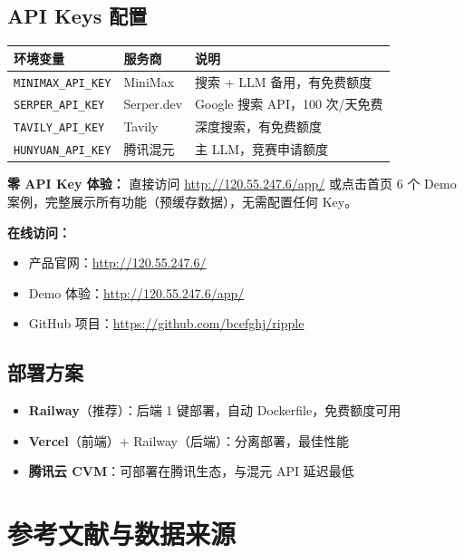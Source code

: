 \documentclass[12pt,a4paper]{ctexart}
\begin{document}
\subsection{API Keys 配置}

\begin{center}
\begin{tabular}{p{3.5cm} p{4cm} p{6cm}}
\toprule
\textbf{环境变量} & \textbf{服务商} & \textbf{说明} \\
\midrule
\texttt{MINIMAX\_API\_KEY} & MiniMax & 搜索 + LLM 备用，有免费额度 \\[2pt]
\texttt{SERPER\_API\_KEY} & Serper.dev & Google 搜索 API，100 次/天免费 \\[2pt]
\texttt{TAVILY\_API\_KEY} & Tavily & 深度搜索，有免费额度 \\[2pt]
\texttt{HUNYUAN\_API\_KEY} & 腾讯混元 & 主 LLM，竞赛申请额度 \\
\bottomrule
\end{tabular}
\end{center}

\textbf{零 API Key 体验：} 直接访问 \url{http://120.55.247.6/app/} 或点击首页 6 个 Demo 案例，完整展示所有功能（预缓存数据），无需配置任何 Key。

\textbf{在线访问：}
\begin{itemize}
  \item 产品官网：\url{http://120.55.247.6/}
  \item Demo 体验：\url{http://120.55.247.6/app/}
  \item GitHub 项目：\url{https://github.com/bcefghj/ripple}
\end{itemize}

\subsection{部署方案}

\begin{itemize}
  \item \textbf{Railway}（推荐）：后端 1 键部署，自动 Dockerfile，免费额度可用
  \item \textbf{Vercel}（前端）+ Railway（后端）：分离部署，最佳性能
  \item \textbf{腾讯云 CVM}：可部署在腾讯生态，与混元 API 延迟最低
\end{itemize}

\section{参考文献与数据来源}
\end{document}
